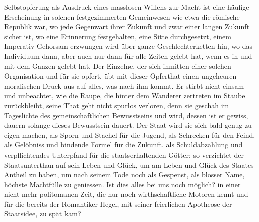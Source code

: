 Selbstopferung als Ausdruck eines masslosen Willens zur Macht ist eine häufige Erscheinung in solchen festgezimmerten Gemeinwesen wie etwa die römische Republik war, wo jede Gegenwart ihrer Zukunft und zwar einer langen Zukunft sicher ist, wo eine Erinnerung festgehalten, eine Sitte durchgesetzt, einem Imperativ Gehorsam erzwungen wird über ganze Geschlechterketten hin, wo das Individuum dann, aber auch nur dann für alle Zeiten gelebt hat, wenn es in und mit dem Ganzen gelebt hat. Der Einzelne, der sich inmitten einer solchen Organisation und für sie opfert, übt mit dieser Opferthat einen ungeheuren moralischen Druck aus auf alles, was nach ihm kommt. Er stirbt nicht einsam und unbeachtet, wie die Raupe, die hinter dem Wanderer zertreten im Staube zurückbleibt, seine That geht nicht spurlos verloren, denn sie geschah im Tageslichte des gemeinschaftlichen Bewusstseins und wird, dessen ist er gewiss, dauern solange dieses Bewusstsein dauert. Der Staat wird sie sich bald genug zu eigen machen, als Sporn und Stachel für die Jugend, als Schrecken für den Feind, als Gelöbniss und bindende Formel für die Zukunft, als Schuldabzahlung und verpflichtendes Unterpfand für die staatserhaltenden Götter: so verzichtet der Staatsunterthan auf sein Leben und Glück, um am Leben und Glück des Staates Antheil zu haben, um nach seinem Tode noch als Gespenst, als blosser Name, höchste Machtfülle zu geniessen. Ist dies alles bei uns noch möglich? in einer nicht mehr politomanen Zeit, die nur noch wirthschaftliche Motoren kennt und für die bereits der Romantiker Hegel, mit seiner feierlichen Apotheose der Staatsidee, zu spät kam?
\par

